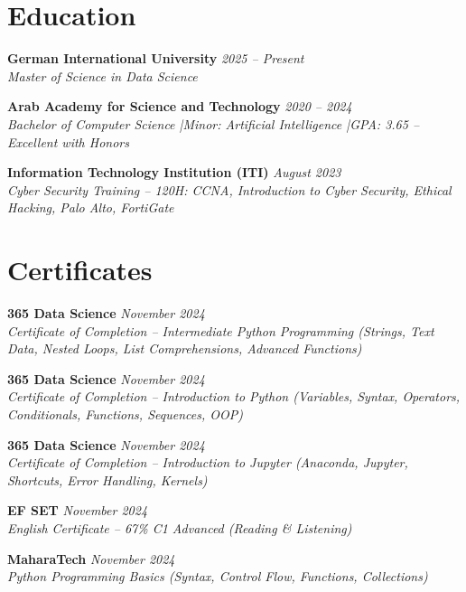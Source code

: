 \documentclass[a4paper,11pt]{article}
\newcommand{\cveducation}[3]{%
  \textbf{#1} \hfill \textit{#3} \\
  \textit{#2}
  \vspace{2pt}
}
\newcommand{\cvcert}[3]{%
  \textbf{#1} \hfill \textit{#3} \\
  \textit{#2}
  \vspace{2pt}
}
\begin{document}
\section{Education}

\cveducation{German International University}{Master of Science in Data Science}{2025 -- Present}

\vspace{6pt}

\cveducation{Arab Academy for Science and Technology}{Bachelor of Computer Science \quad|\quad Minor: Artificial Intelligence \quad|\quad GPA: 3.65 -- Excellent with Honors}{2020 -- 2024}

\vspace{6pt}

\cveducation{Information Technology Institution (ITI)}{Cyber Security Training -- 120H: CCNA, Introduction to Cyber Security, Ethical Hacking, Palo Alto, FortiGate}{August 2023}

\section{Certificates}

\cvcert{365 Data Science}{Certificate of Completion -- Intermediate Python Programming (Strings, Text Data, Nested Loops, List Comprehensions, Advanced Functions)}{November 2024}

\vspace{4pt}

\cvcert{365 Data Science}{Certificate of Completion -- Introduction to Python (Variables, Syntax, Operators, Conditionals, Functions, Sequences, OOP)}{November 2024}

\vspace{4pt}

\cvcert{365 Data Science}{Certificate of Completion -- Introduction to Jupyter (Anaconda, Jupyter, Shortcuts, Error Handling, Kernels)}{November 2024}

\vspace{4pt}

\cvcert{EF SET}{English Certificate -- 67\% C1 Advanced (Reading \& Listening)}{November 2024}

\vspace{4pt}

\cvcert{MaharaTech}{Python Programming Basics (Syntax, Control Flow, Functions, Collections)}{November 2024}
\end{document}

